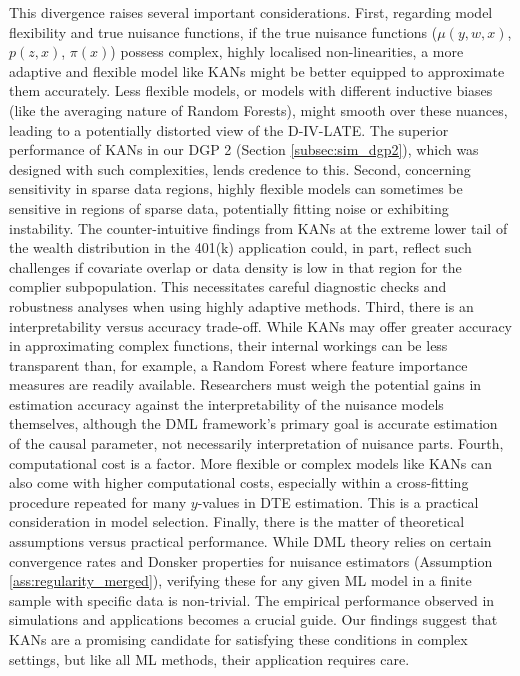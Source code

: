 \documentclass[final,3p,fleqn, 10pt]{elsarticle}
\begin{document}
This divergence raises several important considerations.
First, regarding model flexibility and true nuisance functions, if the true nuisance functions ($\mu(y,w,x)$, $p(z,x)$, $\pi(x)$) possess complex, highly localised non-linearities, a more adaptive and flexible model like KANs might be better equipped to approximate them accurately. Less flexible models, or models with different inductive biases (like the averaging nature of Random Forests), might smooth over these nuances, leading to a potentially distorted view of the D-IV-LATE. The superior performance of KANs in our DGP 2 (Section \ref{subsec:sim_dgp2}), which was designed with such complexities, lends credence to this.
Second, concerning sensitivity in sparse data regions, highly flexible models can sometimes be sensitive in regions of sparse data, potentially fitting noise or exhibiting instability. The counter-intuitive findings from KANs at the extreme lower tail of the wealth distribution in the 401(k) application could, in part, reflect such challenges if covariate overlap or data density is low in that region for the complier subpopulation. This necessitates careful diagnostic checks and robustness analyses when using highly adaptive methods.
Third, there is an interpretability versus accuracy trade-off. While KANs may offer greater accuracy in approximating complex functions, their internal workings can be less transparent than, for example, a Random Forest where feature importance measures are readily available. Researchers must weigh the potential gains in estimation accuracy against the interpretability of the nuisance models themselves, although the DML framework's primary goal is accurate estimation of the causal parameter, not necessarily interpretation of nuisance parts.
Fourth, computational cost is a factor. More flexible or complex models like KANs can also come with higher computational costs, especially within a cross-fitting procedure repeated for many $y$-values in DTE estimation. This is a practical consideration in model selection.
Finally, there is the matter of theoretical assumptions versus practical performance. While DML theory relies on certain convergence rates and Donsker properties for nuisance estimators (Assumption \ref{ass:regularity_merged}), verifying these for any given ML model in a finite sample with specific data is non-trivial. The empirical performance observed in simulations and applications becomes a crucial guide. Our findings suggest that KANs are a promising candidate for satisfying these conditions in complex settings, but like all ML methods, their application requires care.
\end{document}
